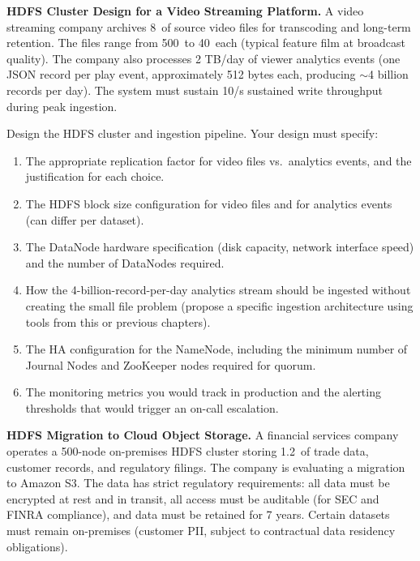 \bigskip
{}

\dpr \textbf{HDFS Cluster Design for a Video Streaming Platform.}
A video streaming company archives 8\PB\ of source video files for
transcoding and long-term retention. The files range from 500\MB\ to
40\GB\ each (typical feature film at broadcast quality). The company
also processes 2 TB/day of viewer analytics events (one JSON record
per play event, approximately 512 bytes each, producing $\sim$4
billion records per day). The system must sustain 10\GB/s sustained
write throughput during peak ingestion.

Design the HDFS cluster and ingestion pipeline. Your design must specify:
\begin{enumerate}[label=(\alph*)]
  \item The appropriate replication factor for video files vs.\ analytics
        events, and the justification for each choice.
  \item The HDFS block size configuration for video files and for
        analytics events (can differ per dataset).
  \item The DataNode hardware specification (disk capacity, network
        interface speed) and the number of DataNodes required.
  \item How the 4-billion-record-per-day analytics stream should be
        ingested without creating the small file problem (propose a
        specific ingestion architecture using tools from this or
        previous chapters).
  \item The HA configuration for the NameNode, including the minimum
        number of Journal Nodes and ZooKeeper nodes required for
        quorum.
  \item The monitoring metrics you would track in production and the
        alerting thresholds that would trigger an on-call escalation.
\end{enumerate}

\dpr \textbf{HDFS Migration to Cloud Object Storage.}
A financial services company operates a 500-node on-premises HDFS
cluster storing 1.2\PB\ of trade data, customer records, and
regulatory filings. The company is evaluating a migration to Amazon
S3. The data has strict regulatory requirements: all data must be
encrypted at rest and in transit, all access must be auditable (for
SEC and FINRA compliance), and data must be retained for 7 years.
Certain datasets must remain on-premises (customer PII, subject to
contractual data residency obligations).

